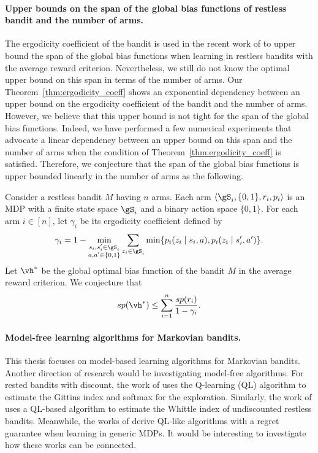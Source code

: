 \paragraph{Upper bounds on the span of the global bias functions of restless bandit and the number of arms.}
The ergodicity coefficient of the bandit is used in the recent work of \cite{akbarzadeh2022learning} to upper bound the span of the global bias functions when learning in restless bandits with the average reward criterion.
Nevertheless, we still do not know the optimal upper bound on this span in terms of the number of arms. 
Our Theorem~\ref{thm:ergodicity_coeff} shows an exponential dependency between an upper bound on the ergodicity coefficient of the bandit and the number of arms.
However, we believe that this upper bound is not tight for the span of the global bias functions.
Indeed, we have performed a few numerical experiments that advocate a linear dependency between an upper bound on this span and the number of arms when the condition of Theorem~\ref{thm:ergodicity_coeff} is satisfied.
Therefore, we conjecture that the span of the global bias functions is upper bounded linearly in the number of arms as the following.
\begin{conj}
    \label{conj:span}
    Consider a restless bandit $M$ having $n$ arms.
    Each arm $\langle\gS_i,\{0,1\},r_i,p_i\rangle$ is an MDP with a finite state space $\gS_i$ and a binary action space $\{0,1\}$.
    For each arm $i\in[n]$, let $\gamma_i$ be its ergodicity coefficient defined by
    \begin{align*}
        \gamma_i = 1-\min_{\substack{s_i,s'_i\in\gS_i \\a,a'\in\{0,1\}}} \sum_{z_i\in\gS_i} \min\{p_i(z_i \mid s_i, a), p_i(z_i \mid s'_i, a')\}.
    \end{align*}
    Let $\vh^*$ be the global optimal bias function of the bandit $M$ in the average reward criterion.
    We conjecture that
    \begin{align*}
        sp(\vh^*) \le \sum_{i=1}^n\frac{sp(r_i)}{1-\gamma_i}.
    \end{align*}
\end{conj}

\paragraph{Model-free learning algorithms for Markovian bandits.}
This thesis focuses on model-based learning algorithms for Markovian bandits. 
Another direction of research would be investigating model-free algorithms.
For rested bandits with discount, the work of \cite{duff1995q} uses the Q-learning (QL) algorithm to estimate the Gittins index and softmax for the exploration.
Similarly, the work of \cite{avrachenkov2022whittle} uses a QL-based algorithm to estimate the Whittle index of undiscounted restless bandits.
Meanwhile, the works of \cite{jin2018q, wei2020model} derive QL-like algorithms with a regret guarantee when learning in generic MDPs.
It would be interesting to investigate how these works can be connected.

